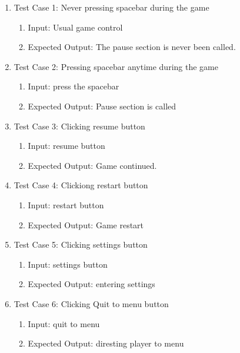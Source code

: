 \documentclass[11pt]{article}
\begin{document}
    \begin{enumerate}
        \item Test Case 1: Never pressing spacebar during the game
        \begin{enumerate}
            \item Input: Usual game control
            \item Expected Output: The pause section is never been called.
        \end{enumerate}
        
        \item Test Case 2: Pressing spacebar anytime during the game
        \begin{enumerate}
            \item Input: press the spacebar
            \item Expected Output: Pause section is called
        \end{enumerate}
        
        \item Test Case 3: Clicking resume button
        \begin{enumerate}
            \item Input: resume button
            \item Expected Output: Game continued.
        \end{enumerate}

        \item Test Case 4: Clickiong restart button
        \begin{enumerate}
            \item Input: restart button
            \item Expected Output: Game restart
        \end{enumerate}
        
        \item Test Case 5: Clicking settings button
        \begin{enumerate}
            \item Input: settings button
            \item Expected Output: entering settings
        \end{enumerate}

        \item Test Case 6: Clicking Quit to menu button
        \begin{enumerate}
            \item Input: quit to menu
            \item Expected Output: diresting player to menu
        \end{enumerate}

        
    \end{enumerate}
\end{document}
